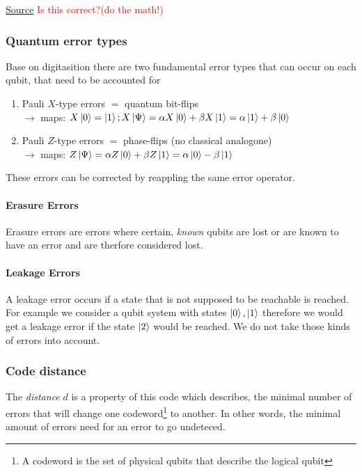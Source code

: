 \href{https://quantumcomputing.stackexchange.com/questions/35211/digitization-of-errors-in-qec}{Source}
\textcolor{red}{Is this correct?(do the math!)}

\subsubsection{Quantum error types}
Base on digitasition there are two fundamental error types that can occur on each qubit, 
that need to be accounted for \cite{QECintro}
\begin{enumerate}
    \item Pauli $X$-type errors $=$ quantum bit-flips \\
    $\rightarrow$ maps: $X\ket{0} = \ket{1}; X \ket{\Psi}= \alpha X \ket{0} + \beta X \ket{1} = \alpha  \ket{1} + \beta \ket{0}   $
    \item Pauli $Z$-type errors $=$ phase-flips (no classical analogone)\\
    $\rightarrow$ maps:  $Z \ket{\Psi}= \alpha Z \ket{0} + \beta Z \ket{1} = \alpha  \ket{0} - \beta \ket{1}   $
\end{enumerate}
These errors can be corrected by reappling the same error operator.

\paragraph{Erasure Errors}
Erasure errors are errors where certain, \textit{known} qubits are lost or are known to have an error 
and are therfore considered lost. \cite{QECmemory}

\paragraph{Leakage Errors}
A leakage error occurs if a state that is not supposed to be reachable is reached. 
For example we consider a qubit system with states $\ket{0},\ket{1}$ therefore we would get a leakage error 
if the state $\ket{2}$ would be reached.
We do not take those kinds of errors into account.


\subsubsection{Code distance}\label{sec:code_distance}
The \textit{distance} $d$ is a property of this code which describes, 
the minimal number of errors that will change one 
codeword\footnote{A codeword is the set of physical qubits that describe the logical qubit} to another.
In other words, the minimal amount of errors need for an error to go undeteced. \cite{QECintro}

